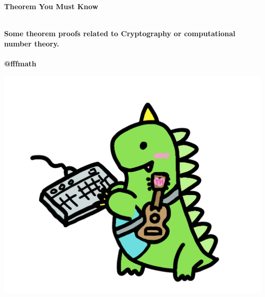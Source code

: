 
\thispagestyle{empty}

\vspace{3cm}
  \begin{center}
	\bfseries \Huge Theorem You Must Know \par   %
        ~\\
	\bfseries \LARGE Some theorem proofs related to Cryptography or computational number theory. \\   %
        ~\\
        \bfseries \Large @fffmath \par   %

        \vspace{3cm}
    
      	{\centering \includegraphics[width=0.8\linewidth]{images/myavatar.png}}
    \end{center}
    
\par

\newpage
